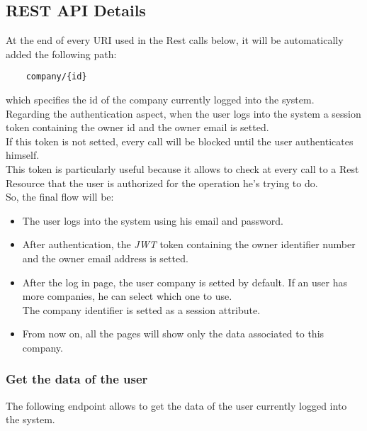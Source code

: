 \subsection{REST API Details}
At the end of every URI used in the Rest calls below, it will be automatically added the following path: 
\begin{lstlisting}
    company/{id}
\end{lstlisting}
which specifies the id of the company currently logged into the system. \\
Regarding the authentication aspect, when the user logs into the system a session token containing the owner id and the owner email is setted. \\
If this token is not setted, every call will be blocked until the user authenticates himself. \\
This token is particularly useful because it allows to check at every call to a Rest Resource that the user is authorized for the operation he's trying to do. \\
So, the final flow will be:
\begin{itemize}
    \item The user logs into the system using his email and password.
    \item After authentication, the \textit{JWT} token containing the owner identifier number and the owner email address is setted.
    \item After the log in page, the user company is setted by default. If an user has more companies, he can select which one to use. \\
            The company identifier is setted as a session attribute.
    \item From now on, all the pages will show only the data associated to this company.
\end{itemize}



\subsubsection*{Get the data of the user}

The following endpoint allows to get the data of the user currently logged into the system.

